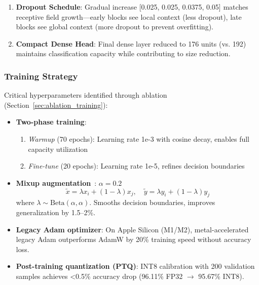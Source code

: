 \documentclass[conference]{IEEEtran}
\begin{document}
\begin{enumerate}
    \item \textbf{Dropout Schedule}: Gradual increase [0.025, 0.025, 0.0375, 0.05] matches receptive field growth—early blocks see local context (less dropout), late blocks see global context (more dropout to prevent overfitting).

    \item \textbf{Compact Dense Head}: Final dense layer reduced to 176 units (vs. 192) maintains classification capacity while contributing to size reduction.
\end{enumerate}

\subsubsection{Training Strategy}

Critical hyperparameters identified through ablation (Section~\ref{sec:ablation_training}):

\begin{itemize}
    \item \textbf{Two-phase training}:
    \begin{enumerate}
        \item \textit{Warmup} (70 epochs): Learning rate 1e-3 with cosine decay, enables full capacity utilization
        \item \textit{Fine-tune} (20 epochs): Learning rate 1e-5, refines decision boundaries
    \end{enumerate}

    \item \textbf{Mixup augmentation}~\cite{zhang2017mixup}: $\alpha=0.2$
    \begin{equation}
        \tilde{x} = \lambda x_i + (1-\lambda) x_j, \quad \tilde{y} = \lambda y_i + (1-\lambda) y_j
    \end{equation}
    where $\lambda \sim \text{Beta}(\alpha, \alpha)$. Smooths decision boundaries, improves generalization by 1.5--2\%.

    \item \textbf{Legacy Adam optimizer}: On Apple Silicon (M1/M2), metal-accelerated legacy Adam outperforms AdamW by 20\% training speed without accuracy loss.

    \item \textbf{Post-training quantization (PTQ)}: INT8 calibration with 200 validation samples achieves <0.5\% accuracy drop (96.11\% FP32 $\to$ 95.67\% INT8).
\end{itemize}

\end{document}
